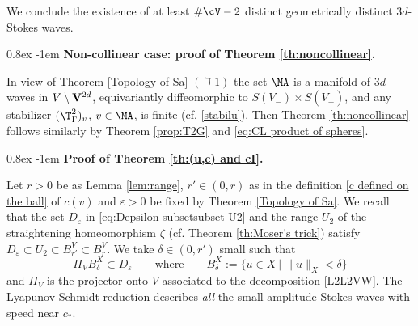 \documentclass[11pt,a4paper,reqno]{article}
\makeatletter
\renewcommand{\paragraph}{%
  \@startsection{paragraph}{4}{\z@}%
  {0.8ex}  %
  {-1em}   %
  {\normalfont\bfseries}%
}
\numberwithin{equation}{section}
\theoremstyle{definition}
\makeatother
\begin{document}
    We conclude the  existence of  at least $\#\cV-{2}$ distinct geometrically 
    distinct $3d$-Stokes waves.

    \paragraph{\bf 
    Non-collinear case: proof of Theorem \ref{th:noncollinear}.}
    
        In view of Theorem \ref{Topology of Sa}-$(\daleth 1)$ the set $\MA $ is a manifold of $ 3d$-waves 
        in $  V\setminus{\bf V}^{2d}$,  
        equivariantly diffeomorphic to $S(V_-)\times S(V_+)$,       and any stabilizer $ (\T_\Gamma^2)_v $, $ v \in \MA $, is finite (cf. \eqref{stabilu}).
      Then   Theorem \ref{th:noncollinear}
        follows similarly by 
         Theorem \ref{prop:T2G}
         and
\eqref{eq:CL product of spheres}.  



    
    
\paragraph{\bf Proof of Theorem 
\ref{th:(u,c) and cI}.}

   
        Let $r>0$ be as Lemma \ref{lem:range}, $r'\in (0,r)$ as in the definition 
        \eqref{c defined on the ball} of $c(v)$  and $\varepsilon>0$ be fixed by  Theorem \ref{Topology of Sa}.
        We recall that the set 
        $ D_\varepsilon $
        in \eqref{eq:Depsilon subsetsubset U2}
        and the range $ U_2 $ of the 
        straightening 
        homeomorphism $ \zeta $  
        (cf. Theorem \ref{th:Moser's trick}) satisfy
   $
             D_\varepsilon
        \subset U_2\subset B_{r'}^V\subset B_r^V $. 
        We take $\delta \in (0,{r'}) $ 
        small such that 
        \begin{equation}\label{eq:def delta}
        \Pi_V B_{\delta}^X\subset D_\varepsilon
        \qquad
        \text{where} \qquad  B_\delta^X:= \big\{ u\in X \ |\ \|u\|_X<\delta \big\} 
        \end{equation}
         and $\Pi_V$ is the projector onto $V$ associated to the decomposition \eqref{L2L2VW}.
The Lyapunov-Schmidt reduction describes {\it all} the small amplitude Stokes waves with speed near $ c_* $. 
     
\end{document}
